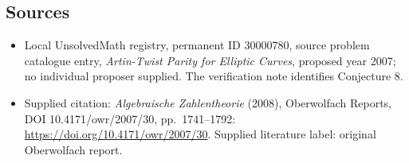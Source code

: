 \documentclass[11pt]{article}
\begin{document}
\subsection{Sources}
\begin{itemize}\item Local UnsolvedMath registry, permanent ID 30000780, source problem catalogue entry, \emph{Artin-Twist Parity for Elliptic Curves}, proposed year 2007; no individual proposer supplied. The verification note identifies Conjecture 8.\item Supplied citation: \emph{Algebraische Zahlentheorie} (2008), Oberwolfach Reports, DOI 10.4171/owr/2007/30, pp.\ 1741--1792: \url{https://doi.org/10.4171/owr/2007/30}. Supplied literature label: original Oberwolfach report.\end{itemize}
\end{document}

